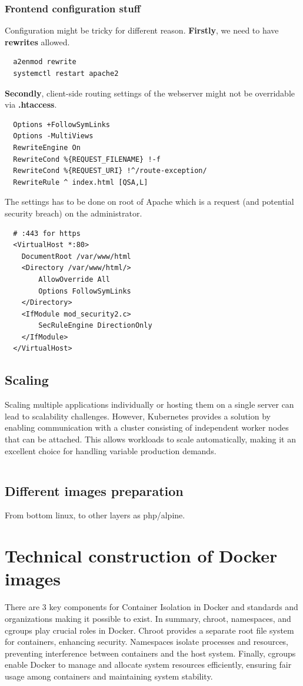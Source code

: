\documentclass{article}
\begin{document}
\subsubsection{Frontend configuration stuff}
Configuration might be tricky for different reason. \textbf{Firstly}, we need to have \textbf{rewrites} allowed.
\begin{lstlisting}
  a2enmod rewrite
  systemctl restart apache2
\end{lstlisting}
\textbf{Secondly}, client-side routing settings of the webserver might not be overridable via \textbf{.htaccess}.  
\begin{lstlisting}
  Options +FollowSymLinks
  Options -MultiViews
  RewriteEngine On
  RewriteCond %{REQUEST_FILENAME} !-f
  RewriteCond %{REQUEST_URI} !^/route-exception/
  RewriteRule ^ index.html [QSA,L]
\end{lstlisting}
The settings has to be done on root of Apache which is a request (and potential security breach) on the administrator.
\begin{lstlisting}
  # :443 for https
  <VirtualHost *:80>
    DocumentRoot /var/www/html
    <Directory /var/www/html/>
        AllowOverride All
        Options FollowSymLinks
    </Directory>
    <IfModule mod_security2.c>
        SecRuleEngine DirectionOnly
    </IfModule>
  </VirtualHost>	
\end{lstlisting}
\subsection{Scaling}
Scaling multiple applications individually or hosting them on a single server can lead to scalability challenges. However, Kubernetes provides a solution by enabling communication with a cluster consisting of independent worker nodes that can be attached. This allows workloads to scale automatically, making it an excellent choice for handling variable production demands. 
\begin{lstlisting}

\end{lstlisting}
\subsection{Different images preparation}
From bottom linux, to other layers as php/alpine.
\section{Technical construction of Docker images}
There are 3 key components for Container Isolation in Docker and standards and organizations making it possible to exist. In summary, chroot, namespaces, and cgroups play crucial roles in Docker. Chroot provides a separate root file system for containers, enhancing security. Namespaces isolate processes and resources, preventing interference between containers and the host system. Finally, cgroups enable Docker to manage and allocate system resources efficiently, ensuring fair usage among containers and maintaining system stability.
\end{document}
